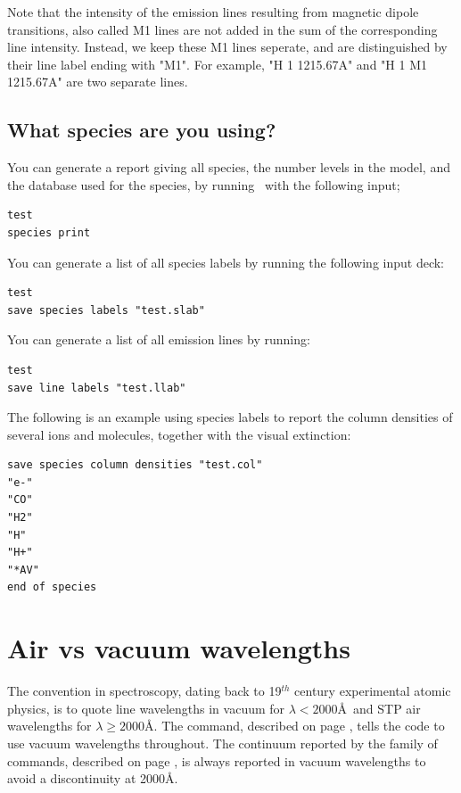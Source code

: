 Note that the intensity of the emission lines resulting from magnetic dipole
transitions, also called M1 lines are not added in the sum of the corresponding
line intensity. Instead, we keep these M1 lines seperate, and are distinguished
by their line label ending with "M1". For example, "H  1 1215.67A" and
"H  1 M1 1215.67A" are two separate lines.

\subsection{What species are you using?}

You can generate a report giving all species, the number levels in the model,
and the database used for the species,
by running \Cloudy\ with the following input;
\begin{verbatim}
test
species print
\end{verbatim}

You can generate a list of all species labels by running the following input deck:
\begin{verbatim}
test
save species labels "test.slab"
\end{verbatim}

You can generate a list of all emission lines by running:
\begin{verbatim}
test
save line labels "test.llab"
\end{verbatim}

The following is an example using species labels to report the column densities 
of several ions and molecules, together with the visual extinction:
\begin{verbatim}
save species column densities "test.col"
"e-"
"CO"
"H2"
"H"
"H+"
"*AV"
end of species
\end{verbatim}

\section{Air vs vacuum wavelengths}
\label{sec:AirVsVacuumWavelengths}
The convention in spectroscopy, dating back to 19$^{th}$ century experimental atomic physics,
is to quote line wavelengths in vacuum for  $\lambda < 2000$\AA\ and STP air wavelengths
for $\lambda \ge 2000$\AA.
The  command, 
described on page \pageref{sec:CommandPrintVacuum},
tells the code to use vacuum wavelengths throughout.
The continuum reported by the family of  commands,
described on page \pageref{sec:CommandSaveContinuum},
is always reported in vacuum wavelengths to avoid 
a discontinuity at 2000\AA.


